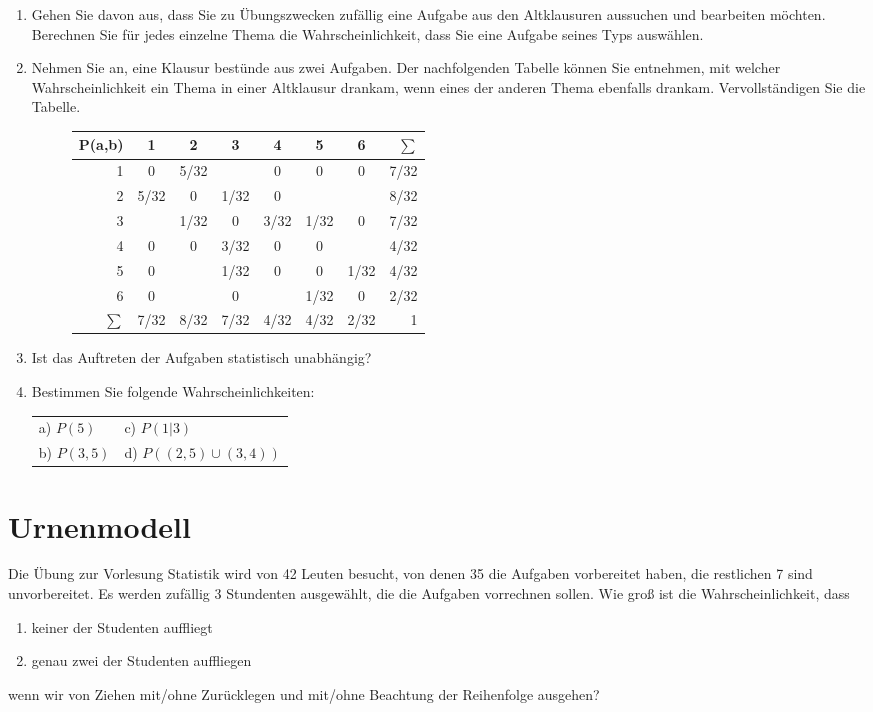 \documentclass[11pt, a4paper]{article}
\begin{document}
\begin{enumerate}[label=\alph*)]
\item Gehen Sie davon aus, dass Sie zu Übungszwecken zufällig eine Aufgabe aus den Altklausuren aussuchen und bearbeiten möchten. Berechnen Sie für jedes einzelne Thema die Wahrscheinlichkeit, dass Sie eine Aufgabe seines Typs auswählen.
\item Nehmen Sie an, eine Klausur bestünde aus zwei Aufgaben. Der nachfolgenden Tabelle können Sie entnehmen, mit welcher Wahrscheinlichkeit ein Thema in einer Altklausur drankam, wenn eines der anderen Thema ebenfalls drankam. Vervollständigen Sie die Tabelle.


\begin{figure}[h!]
\centering
\setlength\extrarowheight{5pt}
\begin{tabular}{r|cccccc|r}
	P(a,b)	& 1 	& 2 	& 3 	& 4 	& 5 	& 6 	& $\sum$\\ \hline
	1 		& 0 	& 5/32 	&  		& 0  	& 0  	& 0 	& 7/32 \\
	2 		& 5/32	& 0		& 1/32 	& 0 	&   	&   	& 8/32 \\
	3 		& 		& 1/32 	& 0 	& 3/32 	& 1/32 	& 0  	& 7/32 \\
	4 		& 0		& 0 	& 3/32 	& 0 	& 0  	&   	& 4/32 \\
	5 		& 0  	&   	& 1/32 	& 0 	& 0  	& 1/32 	& 4/32 \\
	6 		& 0 	&   	& 0  	&  		& 1/32 	& 0 	& 2/32 \\ \hline
	$\sum$ 	& 7/32 	& 8/32 	& 7/32 	& 4/32 	& 4/32 	& 2/32  & 1\\
\end{tabular}
\end{figure}

\item Ist das Auftreten der Aufgaben statistisch unabhängig?
\item Bestimmen Sie folgende Wahrscheinlichkeiten:

	\begin{tabular}{ll}
	a) $P(5)$ \hspace{5cm} 				& c) $P(1|3)$\\
	b) $P(3, 5)$ 					& d) $P((2, 5) \cup (3, 4))$
	\end{tabular}

\end{enumerate}

\newpage
\section{Urnenmodell}
Die Übung zur Vorlesung Statistik wird von 42 Leuten besucht, von denen 35 die Aufgaben vorbereitet haben, die restlichen 7 sind unvorbereitet. Es werden zufällig 3 Stundenten ausgewählt, die die Aufgaben vorrechnen sollen. Wie groß ist die Wahrscheinlichkeit, dass
\begin{enumerate}
	\item keiner der Studenten auffliegt
	\item genau zwei der Studenten auffliegen
\end{enumerate}
wenn wir von Ziehen mit/ohne Zurücklegen und mit/ohne Beachtung der Reihenfolge ausgehen?
\end{document}

